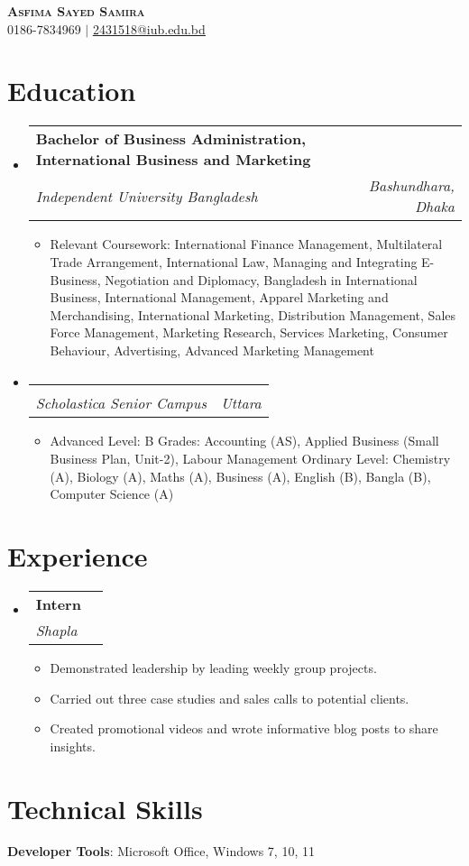 \documentclass[letterpaper,11pt]{article}
\makeatletter
\newcommand{\resumeItem}[1]{
  \item\small{
    {#1 \vspace{-2pt}}
  }
}
\newcommand{\resumeSubheading}[4]{
  \vspace{-2pt}\item
    \begin{tabular*}{0.97\textwidth}[t]{l@{\extracolsep{\fill}}r}
      \textbf{#1} & #2 \\
      \textit{\small#3} & \textit{\small #4} \\
    \end{tabular*}\vspace{-7pt}
}
\newcommand{\resumeSubHeadingListStart}{\begin{itemize}[leftmargin=0.15in, label={}]}
\newcommand{\resumeSubHeadingListEnd}{\end{itemize}}
\newcommand{\resumeItemListStart}{\begin{itemize}}
\newcommand{\resumeItemListEnd}{\end{itemize}\vspace{-5pt}}
\makeatother
\begin{document}
\begin{center}
    \textbf{\Huge \scshape Asfima Sayed Samira} \\ \vspace{1pt}
    \small 0186-7834969 $|$ \href{mailto:2431518@iub.edu.bd}{\underline{2431518@iub.edu.bd}}
\end{center}

\section{Education}
  \resumeSubHeadingListStart
    \resumeSubheading
      {Bachelor of Business Administration, International Business and Marketing}{}
      {Independent University Bangladesh}{Bashundhara, Dhaka}
      \resumeItemListStart
        \resumeItem{Relevant Coursework: International Finance Management, Multilateral Trade Arrangement, International Law, Managing and Integrating E-Business, Negotiation and Diplomacy, Bangladesh in International Business, International Management, Apparel Marketing and Merchandising, International Marketing, Distribution Management, Sales Force Management, Marketing Research, Services Marketing, Consumer Behaviour, Advertising, Advanced Marketing Management}
      \resumeItemListEnd
    \resumeSubheading
      {}{}
      {Scholastica Senior Campus}{Uttara}
      \resumeItemListStart
        \resumeItem{Advanced Level: B Grades: Accounting (AS), Applied Business (Small Business Plan, Unit-2), Labour Management
Ordinary Level: Chemistry (A), Biology (A), Maths (A), Business (A), English (B), Bangla (B), Computer Science (A)}
      \resumeItemListEnd
  \resumeSubHeadingListEnd

\section{Experience}
  \resumeSubHeadingListStart
    \resumeSubheading
      {Intern}{}
      {Shapla}{}
      \resumeItemListStart
        \resumeItem{Demonstrated leadership by leading weekly group projects.}
        \resumeItem{Carried out three case studies and sales calls to potential clients.}
        \resumeItem{Created promotional videos and wrote informative blog posts to share insights.}
      \resumeItemListEnd
  \resumeSubHeadingListEnd

\section{Technical Skills}
 \begin{itemize}[leftmargin=0.15in, label={}]
    \small{\item{
     \textbf{Developer Tools}: Microsoft Office, Windows 7, 10, 11
    }}
 \end{itemize}
\end{document}
